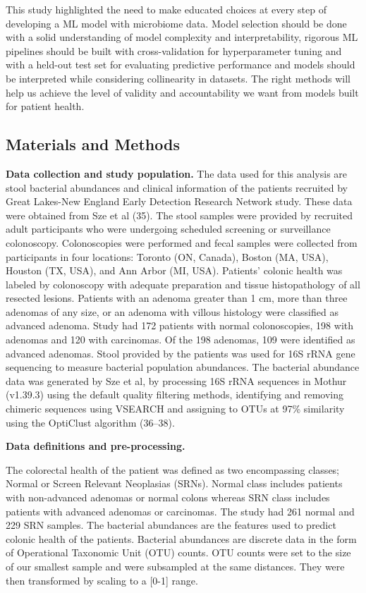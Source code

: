 \documentclass[11pt,]{article}
\begin{document}
This study highlighted the need to make educated choices at every step
of developing a ML model with microbiome data. Model selection should be
done with a solid understanding of model complexity and
interpretability, rigorous ML pipelines should be built with
cross-validation for hyperparameter tuning and with a held-out test set
for evaluating predictive performance and models should be interpreted
while considering collinearity in datasets. The right methods will help
us achieve the level of validity and accountability we want from models
built for patient health.

\subsection{Materials and Methods}\label{materials-and-methods}

\textbf{Data collection and study population.} The data used for this
analysis are stool bacterial abundances and clinical information of the
patients recruited by Great Lakes-New England Early Detection Research
Network study. These data were obtained from Sze et al (35). The stool
samples were provided by recruited adult participants who were
undergoing scheduled screening or surveillance colonoscopy.
Colonoscopies were performed and fecal samples were collected from
participants in four locations: Toronto (ON, Canada), Boston (MA, USA),
Houston (TX, USA), and Ann Arbor (MI, USA). Patients' colonic health was
labeled by colonoscopy with adequate preparation and tissue
histopathology of all resected lesions. Patients with an adenoma greater
than 1 cm, more than three adenomas of any size, or an adenoma with
villous histology were classified as advanced adenoma. Study had 172
patients with normal colonoscopies, 198 with adenomas and 120 with
carcinomas. Of the 198 adenomas, 109 were identified as advanced
adenomas. Stool provided by the patients was used for 16S rRNA gene
sequencing to measure bacterial population abundances. The bacterial
abundance data was generated by Sze et al, by processing 16S rRNA
sequences in Mothur (v1.39.3) using the default quality filtering
methods, identifying and removing chimeric sequences using VSEARCH and
assigning to OTUs at 97\% similarity using the OptiClust algorithm
(36--38).

\textbf{Data definitions and pre-processing.}

The colorectal health of the patient was defined as two encompassing
classes; Normal or Screen Relevant Neoplasias (SRNs). Normal class
includes patients with non-advanced adenomas or normal colons whereas
SRN class includes patients with advanced adenomas or carcinomas. The
study had 261 normal and 229 SRN samples. The bacterial abundances are
the features used to predict colonic health of the patients. Bacterial
abundances are discrete data in the form of Operational Taxonomic Unit
(OTU) counts. OTU counts were set to the size of our smallest sample and
were subsampled at the same distances. They were then transformed by
scaling to a {[}0-1{]} range.
\end{document}
